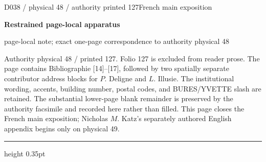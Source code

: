 \documentclass[9pt]{article}
\newcommand{\CanonText}[1]{\par{\fontsize{8.0}{9.35}\selectfont\RaggedRight #1\par}\vspace{2.2pt}}
\newcommand{\LayerTitle}{Restrained page-local apparatus}
\begin{document}
\noindent\begin{minipage}[t][\dimexpr\textheight-5pt\relax][t]{\textwidth}
{\sffamily\fontsize{7.3}{8.2}\selectfont\color{Quiet} D038 / physical 48 / authority printed 127\hfill French main exposition}
\par{}\vspace{4.5pt}
{\sffamily\fontsize{10.4}{11.6}\selectfont\bfseries\color{Accent} \LayerTitle}
\par{\sffamily\fontsize{6.7}{7.7}\selectfont\color{Quiet} page-local note; exact one-page correspondence to authority physical 48}
\vspace{5pt}
\CanonText{Authority physical 48 / printed 127. Folio 127 is excluded from reader prose. The page contains Bibliographie [14]–[17], followed by two spatially separate contributor address blocks for \(P\). Deligne and \(L\). Illusie. The institutional wording, accents, building number, postal codes, and BURES/YVETTE slash are retained. The substantial lower-page blank remainder is preserved by the authority facsimile and recorded here rather than filled. This page closes the French main exposition; Nicholas \(M\). Katz's separately authored English appendix begins only on physical 49.}
\vfill
{\color{Accent}\hrule height 0.35pt}\vspace{3pt}
\end{minipage}
\newpage
\end{document}
